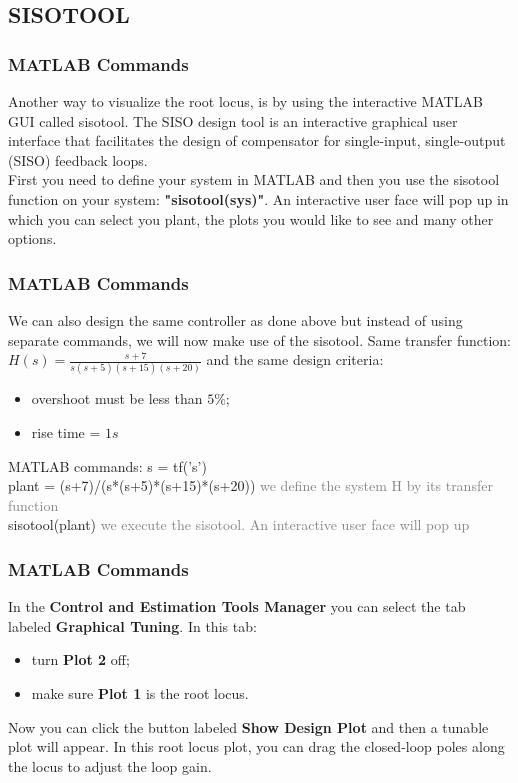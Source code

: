 \subsection{SISOTOOL}

\begin{frame}
\frametitle{MATLAB Commands}
	\justify
	Another way to visualize the root locus, is by using the interactive MATLAB GUI called sisotool. The SISO design tool is an interactive graphical user interface that facilitates the design of compensator for single-input, single-output (SISO) feedback loops.\\
	\vspace{1em}
	First you need to define your system in MATLAB and then you use the sisotool function on your system: \textbf{"sisotool(sys)"}. An interactive user face will pop up in which you can select you plant, the plots you would like to see and many other options.	
\end{frame}

\begin{frame}
\frametitle{MATLAB Commands}
	\begin{example}
		\justify
		We can also design the same controller as done above but instead of using separate commands, we will now make use of the sisotool. 
		Same transfer function: $H(s) = \frac{s+7}{s(s+5)(s+15)(s+20)}$
		and the same design criteria: 
		\begin{itemize}
			\item overshoot must be less than $5\%$;
			\item rise time = $1s$
		\end{itemize}
		MATLAB commands:
		s = tf('s')\\
		plant = (s+7)/(s*(s+5)*(s+15)*(s+20)) \textcolor{gray}{we define the system H by its transfer function} \\
		sisotool(plant) \textcolor{gray}{we execute the sisotool. An interactive user face will pop up}\\ 
	\end{example}
\end{frame}

\begin{frame}
\frametitle{MATLAB Commands}
	\begin{exampleblock}{}
		\justify
		In the \textbf{Control and Estimation Tools Manager} you can select the tab labeled \textbf{Graphical Tuning}. In this tab: 
		\begin{itemize}
			\item turn \textbf{Plot 2} off;
			\item make sure \textbf{Plot 1} is the root locus.
		\end{itemize}
		Now you can click the button labeled \textbf{Show Design Plot} and then a tunable plot will appear. In this root locus plot, you can drag the closed-loop poles along the locus to adjust the loop gain. 
	\end{exampleblock}
\end{frame}


